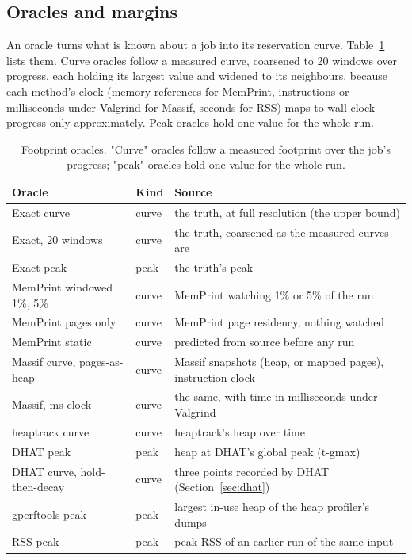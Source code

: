 \documentclass[11pt]{article}
\newcommand{\memprint}{MemPrint}
\newcommand{\secref}[1]{Section~\ref{#1}}
\newcommand{\tabref}[1]{Table~\ref{#1}}
\begin{document}
\subsection{Oracles and margins}
\label{sec:oracles}

An oracle turns what is known about a job into its reservation curve. \tabref{tab:oracles} lists them. Curve
oracles follow a measured curve, coarsened to 20 windows over progress, each holding its largest value and
widened to its neighbours, because each method's clock (memory references for \memprint{}, instructions or
milliseconds under Valgrind for Massif, seconds for RSS) maps to wall-clock progress only approximately. Peak oracles hold one
value for the whole run.

\begin{table}[t]
\centering
\small
\caption{Footprint oracles. "Curve" oracles follow a measured footprint over the job's progress; "peak"
oracles hold one value for the whole run.}
\label{tab:oracles}
\begin{tabular}{lll}
\toprule
Oracle & Kind & Source \\
\midrule
Exact curve & curve & the truth, at full resolution (the upper bound) \\
Exact, 20 windows & curve & the truth, coarsened as the measured curves are \\
Exact peak & peak & the truth's peak \\
MemPrint windowed 1\%, 5\% & curve & \memprint{} watching 1\% or 5\% of the run \\
MemPrint pages only & curve & \memprint{} page residency, nothing watched \\
MemPrint static & curve & predicted from source before any run \\
Massif curve, pages-as-heap & curve & Massif snapshots (heap, or mapped pages), instruction clock \\
Massif, ms clock & curve & the same, with time in milliseconds under Valgrind \\
heaptrack curve & curve & heaptrack's heap over time \\
DHAT peak & peak & heap at DHAT's global peak (t-gmax) \\
DHAT curve, hold-then-decay & curve & three points recorded by DHAT (\secref{sec:dhat}) \\
gperftools peak & peak & largest in-use heap of the heap profiler's dumps \\
RSS peak & peak & peak RSS of an earlier run of the same input \\

\end{tabular}
\end{table}
\end{document}
